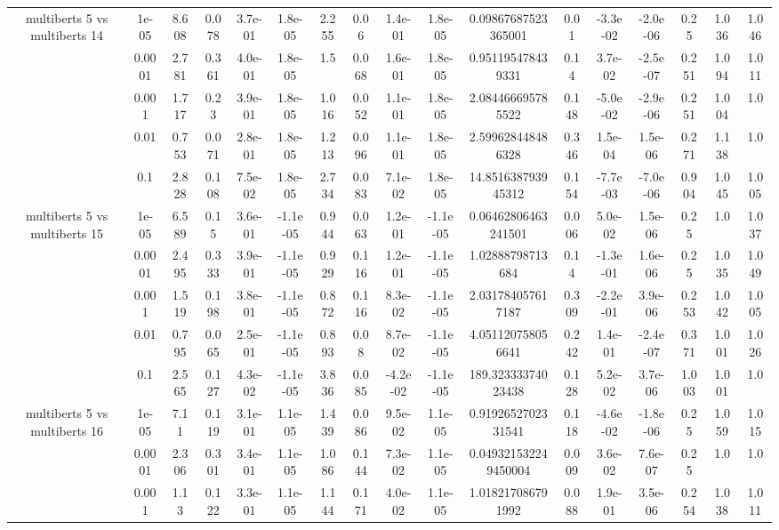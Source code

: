 \begin{tabular}{|c|c|c|c|c|c|c|c|c|c|c|c|c|c|c|c|c|}
\hline
\multirow{5}{*}{multiberts 5 vs multiberts 14} & 1e-05 & 8.608 & 0.078 & 3.7e-01 & 1.8e-05 & 2.255 & 0.06 & 1.4e-01 & 1.8e-05 & 0.09867687523365001 & 0.01 & -3.3e-02 & -2.0e-06 & 0.25 & 1.036 & 1.046 \\
 & 0.0001 & 2.781 & 0.361 & 4.0e-01 & 1.8e-05 & 1.5 & 0.068 & 1.6e-01 & 1.8e-05 & 0.951195478439331 & 0.14 & 3.7e-02 & -2.5e-07 & 0.251 & 1.094 & 1.011 \\
 & 0.001 & 1.717 & 0.23 & 3.9e-01 & 1.8e-05 & 1.016 & 0.052 & 1.1e-01 & 1.8e-05 & 2.084466695785522 & 0.148 & -5.0e-02 & -2.9e-06 & 0.251 & 1.004 & 1.0 \\
 & 0.01 & 0.753 & 0.071 & 2.8e-01 & 1.8e-05 & 1.213 & 0.096 & 1.1e-01 & 1.8e-05 & 2.599628448486328 & 0.346 & 1.5e-04 & 1.5e-06 & 0.271 & 1.138 & 1.0 \\
 & 0.1 & 2.828 & 0.108 & 7.5e-02 & 1.8e-05 & 2.734 & 0.083 & 7.1e-02 & 1.8e-05 & 14.851638793945312 & 0.154 & -7.7e-03 & -7.0e-06 & 0.904 & 1.045 & 1.005 \\
\hline
\multirow{5}{*}{multiberts 5 vs multiberts 15} & 1e-05 & 6.589 & 0.15 & 3.6e-01 & -1.1e-05 & 0.944 & 0.063 & 1.2e-01 & -1.1e-05 & 0.06462806463241501 & 0.006 & 5.0e-02 & 1.5e-06 & 0.25 & 1.0 & 1.037 \\
 & 0.0001 & 2.495 & 0.333 & 3.9e-01 & -1.1e-05 & 0.929 & 0.116 & 1.2e-01 & -1.1e-05 & 1.02888798713684 & 0.14 & -1.3e-01 & 1.6e-06 & 0.25 & 1.035 & 1.049 \\
 & 0.001 & 1.519 & 0.198 & 3.8e-01 & -1.1e-05 & 0.872 & 0.116 & 8.3e-02 & -1.1e-05 & 2.031784057617187 & 0.309 & -2.2e-01 & 3.9e-06 & 0.253 & 1.042 & 1.005 \\
 & 0.01 & 0.795 & 0.065 & 2.5e-01 & -1.1e-05 & 0.893 & 0.08 & 8.7e-02 & -1.1e-05 & 4.051120758056641 & 0.242 & 1.4e-01 & -2.4e-07 & 0.371 & 1.001 & 1.026 \\
 & 0.1 & 2.565 & 0.127 & 4.3e-02 & -1.1e-05 & 3.836 & 0.085 & -4.2e-02 & -1.1e-05 & 189.32333374023438 & 0.128 & 5.2e-02 & 3.7e-06 & 1.003 & 1.001 & 1.0 \\
\hline
\multirow{5}{*}{multiberts 5 vs multiberts 16} & 1e-05 & 7.11 & 0.119 & 3.1e-01 & 1.1e-05 & 1.439 & 0.086 & 9.5e-02 & 1.1e-05 & 0.9192652702331541 & 0.118 & -4.6e-02 & -1.8e-06 & 0.25 & 1.059 & 1.015 \\
 & 0.0001 & 2.306 & 0.301 & 3.4e-01 & 1.1e-05 & 1.086 & 0.144 & 7.3e-02 & 1.1e-05 & 0.049321532249450004 & 0.009 & 3.6e-02 & 7.6e-07 & 0.25 & 1.0 & 1.0 \\
 & 0.001 & 1.13 & 0.122 & 3.3e-01 & 1.1e-05 & 1.144 & 0.171 & 4.0e-02 & 1.1e-05 & 1.018217086791992 & 0.088 & 1.9e-01 & 3.5e-06 & 0.254 & 1.038 & 1.011 \\

\end{tabular}
